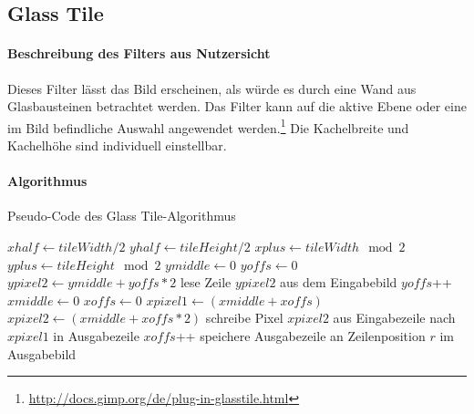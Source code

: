\newpage
\subsection{Glass Tile}

\paragraph{Beschreibung des Filters aus Nutzersicht}

Dieses Filter lässt das Bild erscheinen, als würde es durch eine Wand aus Glasbausteinen betrachtet werden. Das Filter kann auf die aktive Ebene oder eine im Bild befindliche Auswahl angewendet werden.\footnote{\url{http://docs.gimp.org/de/plug-in-glasstile.html}} Die Kachelbreite und Kachelhöhe sind individuell einstellbar.

\paragraph{Algorithmus}

\begin{algorithm}[h]
\caption{Pseudo-Code des \glqq Glass Tile\grqq-Algorithmus}
\label{algo:gtile}
\begin{algorithmic}[1]
\State $xhalf \gets tileWidth  / 2$
\State $yhalf \gets tileHeight / 2$
\State $xplus \gets tileWidth  \mod 2$
\State $yplus \gets tileHeight \mod 2$
\State $ymiddle \gets 0$
\State $yoffs \gets 0$
	\State $ypixel2 \gets ymiddle + yoffs * 2$
	\State lese Zeile $ypixel2$ aus dem Eingabebild
	\State $yoffs$++
	\EndIf
	\State $xmiddle \gets 0$
	\State $xoffs \gets 0$
		\State $xpixel1 \gets (xmiddle + xoffs)$
		\State $xpixel2 \gets (xmiddle + xoffs * 2)$
		\State schreibe Pixel $xpixel2$ aus Eingabezeile nach $xpixel1$ in Ausgabezeile
		\State $xoffs$++
		\EndIf
	\EndFor
	\State speichere Ausgabezeile an Zeilenposition $r$ im Ausgabebild
\EndFor	
\end{algorithmic}
\end{algorithm}

